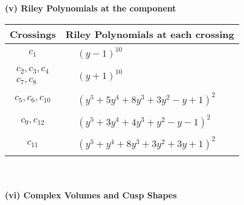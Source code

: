 \documentclass[1p]{elsarticle_modified}
\theoremstyle{definition}
\begin{document}
\newpage\renewcommand{\arraystretch}{1}
\flushleft \textbf{(v) Riley Polynomials at the component}\newline \\
\begin{tabular}{m{50pt}|m{274pt}}
Crossings & \hspace{64pt}Riley Polynomials at each crossing \\
\hline $$\begin{aligned}c_{1}\end{aligned}$$&$\begin{aligned}
&(y-1)^{10}
\end{aligned}$\\
\hline $$\begin{aligned}c_{2},c_{3},c_{4}\\c_{7},c_{8}\end{aligned}$$&$\begin{aligned}
&(y+1)^{10}
\end{aligned}$\\
\hline $$\begin{aligned}c_{5},c_{6},c_{10}\end{aligned}$$&$\begin{aligned}
&(y^5+5 y^4+8 y^3+3 y^2- y+1)^2
\end{aligned}$\\
\hline $$\begin{aligned}c_{9},c_{12}\end{aligned}$$&$\begin{aligned}
&(y^5+3 y^4+4 y^3+y^2- y-1)^2
\end{aligned}$\\
\hline $$\begin{aligned}c_{11}\end{aligned}$$&$\begin{aligned}
&(y^5+y^4+8 y^3+3 y^2+3 y+1)^2
\end{aligned}$\\
\hline
\end{tabular}\\~\\
\newpage\flushleft \textbf{(vi) Complex Volumes and Cusp Shapes}
\end{document}
